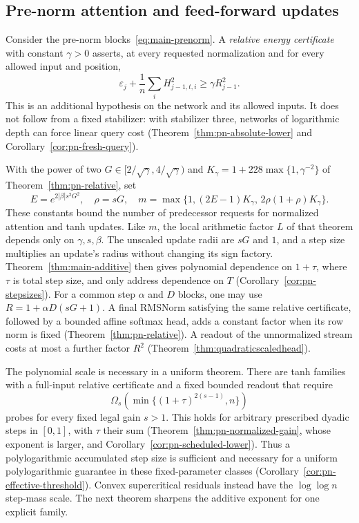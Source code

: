 \subsection{Pre-norm attention and feed-forward updates}

Consider the pre-norm blocks~\eqref{eq:main-prenorm}.
A \emph{relative energy certificate} with constant $\gamma>0$
asserts, at every requested normalization and for every allowed
input and position,
\begin{equation}
 \varepsilon_j+\frac1n\sum_i H_{j-1,t,i}^2
       \ge \gamma R_{j-1}^2 .
 \label{eq:main-relative-floor}
\end{equation}
This is an additional hypothesis on the network and its allowed
inputs. It does not follow from a fixed stabilizer: with stabilizer
three, networks of logarithmic depth can force linear query cost
(Theorem~\ref{thm:pn-absolute-lower} and
Corollary~\ref{cor:pn-fresh-query}).

With the power of two $G\in[2/\sqrt\gamma,4/\sqrt\gamma)$ and
$K_\gamma=1+228\max\{1,\gamma^{-2}\}$ of Theorem~\ref{thm:pn-relative},
set
\begin{equation}
 E=e^{2|\beta|s^2G^2},\quad \rho=sG,\quad
 m=\max\{1,(2E-1)K_\gamma,\,2\rho(1+\rho)K_\gamma\}.
 \label{eq:main-prenorm-m}
\end{equation}
These constants bound the number of predecessor requests for
normalized attention and tanh updates. Like $m$, the local
arithmetic factor $L$ of that theorem depends only on $\gamma,s,\beta$.
The unscaled update radii are $sG$ and $1$, and a step size
multiplies an update's radius without changing its sign factory.
Theorem~\ref{thm:main-additive} then gives polynomial dependence
on $1+\tau$, where $\tau$ is total step size, and only address
dependence on $T$ (Corollary~\ref{cor:pn-stepsizes}). For a common
step $\alpha$ and $D$ blocks, one may use $R=1+\alpha D(sG+1)$.
A final RMSNorm satisfying the same relative certificate,
followed by a bounded affine softmax head, adds a constant
factor when its row norm is fixed (Theorem~\ref{thm:pn-relative}).
A readout of the unnormalized stream costs at most a further
factor $R^2$ (Theorem~\ref{thm:quadraticscaledhead}).

The polynomial scale is necessary in a uniform theorem. There are
tanh families with a full-input relative certificate and a fixed
bounded readout that require
\begin{equation}
 \Omega_s(\min\{(1+\tau)^{2(s-1)},n\})
 \label{eq:main-prenorm-lower}
\end{equation}
probes for every fixed legal gain $s>1$. This holds for arbitrary
prescribed dyadic steps in $[0,1]$, with $\tau$ their sum
(Theorem~\ref{thm:pn-normalized-gain}, whose exponent is larger, and
Corollary~\ref{cor:pn-scheduled-lower}). Thus a
polylogarithmic accumulated step size is sufficient and necessary
for a uniform polylogarithmic guarantee in these fixed-parameter
classes (Corollary~\ref{cor:pn-effective-threshold}). Convex
supercritical residuals instead have the $\log\log n$ step-mass
scale. The next theorem sharpens the additive exponent for one
explicit family.

